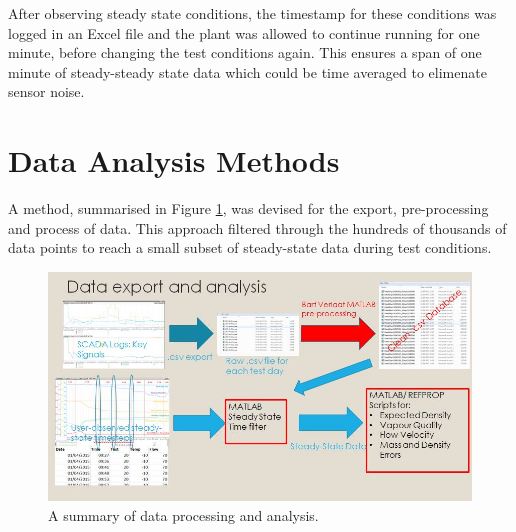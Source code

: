 \documentclass{report}
\begin{document}
After observing steady state conditions, the timestamp for these conditions was logged in an Excel file and the plant was allowed to continue running for one minute, before changing the test conditions again. This ensures a span of one minute of steady-steady state data which could be time averaged to elimenate sensor noise.
\FloatBarrier
\section{Data Analysis Methods} \label{analysis}
A method, summarised in Figure \ref{fig:processing}, was devised for the export, pre-processing and process of data. This approach filtered through the hundreds of thousands of data points to reach a small subset of steady-state data during test conditions. 

\begin{figure}
\includegraphics[width=\textwidth]{processing}
\caption{A summary of data processing and analysis.}
\label{fig:processing}
\end{figure}
\end{document}
